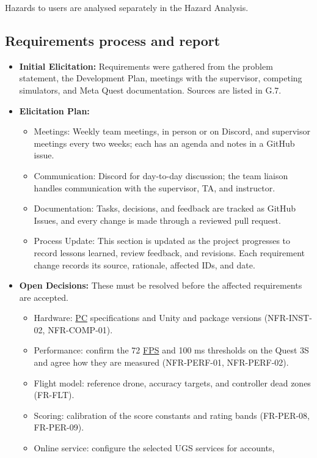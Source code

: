 \documentclass[12pt]{article}
\begin{document}
Hazards to users are analysed separately in the
Hazard Analysis.

\subsection{Requirements process and report}\label{p7}


\begin{itemize}
\item \textbf{Initial Elicitation:} Requirements were gathered from the
problem statement, the Development Plan, meetings with the supervisor,
competing simulators, and Meta Quest documentation. Sources are listed in
G.7.
\item \textbf{Elicitation Plan:}
  \begin{itemize}
  \item Meetings: Weekly team meetings, in person or on Discord, and
  supervisor meetings every two weeks; each has an agenda and notes in a
  GitHub issue.
  \item Communication: Discord for day-to-day discussion; the team liaison
  handles communication with the supervisor, TA, and instructor.
  \item Documentation: Tasks, decisions, and feedback are tracked as GitHub
  Issues, and every change is made through a reviewed pull request.
  \item Process Update: This section is updated as the project progresses to
  record lessons learned, review feedback, and revisions. Each requirement
  change records its source, rationale, affected IDs, and date.
  \end{itemize}
\item \textbf{Open Decisions:} These must be resolved before the affected
requirements are accepted.
  \begin{itemize}
  \item Hardware: \hyperlink{glos:PCVR}{PC} specifications and Unity and package versions
  (NFR-INST-02, NFR-COMP-01).
  \item Performance: confirm the 72 \hyperlink{glos:FPS}{FPS} and 100 ms thresholds on the Quest 3S
  and agree how they are measured (NFR-PERF-01, NFR-PERF-02).
  \item Flight model: reference drone, accuracy targets, and controller dead
  zones (FR-FLT).
  \item Scoring: calibration of the score constants and rating bands
  (FR-PER-08, FR-PER-09).
  \item Online service: configure the selected UGS services for accounts,

\end{itemize}
\end{itemize}
\end{document}
